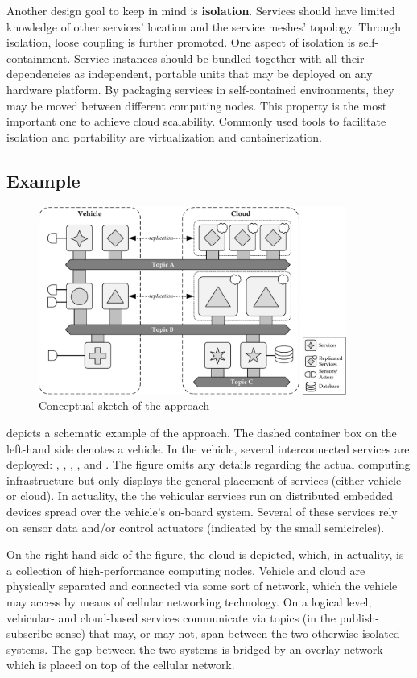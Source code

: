 Another design goal to keep in mind is \textbf{isolation}. Services should have limited knowledge of other services' location and the service meshes' topology. Through isolation, loose coupling is further promoted. One aspect of isolation is self-containment. Service instances should be bundled together with all their dependencies as independent, portable units that may be deployed on any hardware platform. By packaging services in self-contained environments, they may be moved between different computing nodes. This property is the most important one to achieve cloud scalability. Commonly used tools to facilitate isolation and portability are virtualization and containerization.
%
%
%
%
%
%
%
%
%
%
\subsection{Example}
\begin{figure}[htpb]
  \centering
  \includegraphics[width=0.9\textwidth]{figures/idea.pdf}
  \caption[Conceptual sketch of the approach]{Conceptual sketch of the approach}\label{fig:idea}
\end{figure}
 depicts a schematic example of the approach. The dashed container box on the left-hand side denotes a vehicle. In the vehicle, several interconnected services are deployed: , , , , and . The figure omits any details regarding the actual computing infrastructure but only displays the general placement of services (either vehicle or cloud). In actuality, the the vehicular services run on distributed embedded devices spread over the vehicle's on-board system. Several of these services rely on sensor data and/or control actuators (indicated by the small semicircles). 

On the right-hand side of the figure, the cloud is depicted, which, in actuality, is a collection of high-performance computing nodes. Vehicle and cloud are physically separated and connected via some sort of network, which the vehicle may access by means of cellular networking technology. On a logical level, vehicular- and cloud-based services communicate via topics (in the publish-subscribe sense) that may, or may not, span between the two otherwise isolated systems. The gap between the two systems is bridged by an overlay network which is placed on top of the cellular network.

